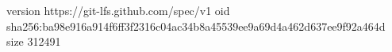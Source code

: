 version https://git-lfs.github.com/spec/v1
oid sha256:ba98e916a914f6ff3f2316c04ac34b8a45539ee9a69d4a462d637ee9f92a464d
size 312491
